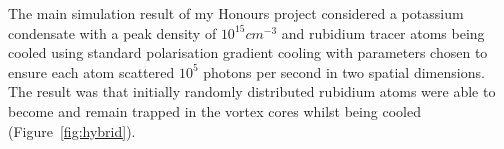 The main simulation result of my Honours project considered a potassium condensate with a peak density of $10^{15}\unit{cm}^{-3}$ and rubidium tracer atoms being cooled using standard polarisation gradient cooling with parameters chosen to ensure each atom scattered $10^5$ photons per second in two spatial dimensions. The result was that initially randomly distributed rubidium atoms were able to become and remain trapped in the vortex cores whilst being cooled (Figure~\ref{fig:hybrid}).

\begin{figure}
\centering
\noindent{}
\noindent{}
\noindent{}

\end{figure}
